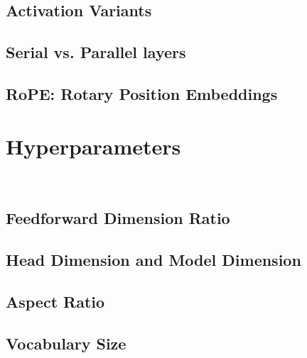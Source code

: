 \subsection{Activation Variants}

\subsection{Serial vs. Parallel layers}

\subsection{RoPE: Rotary Position Embeddings}




























\clearpage
{\chaptoc\noindent\begin{minipage}[inner sep=0,outer sep=0]{0.9\linewidth}\section{Hyperparameters}\end{minipage}}
\\


\subsection{Feedforward Dimension Ratio}

\subsection{Head Dimension and Model Dimension}

\subsection{Aspect Ratio}

\subsection{Vocabulary Size}

